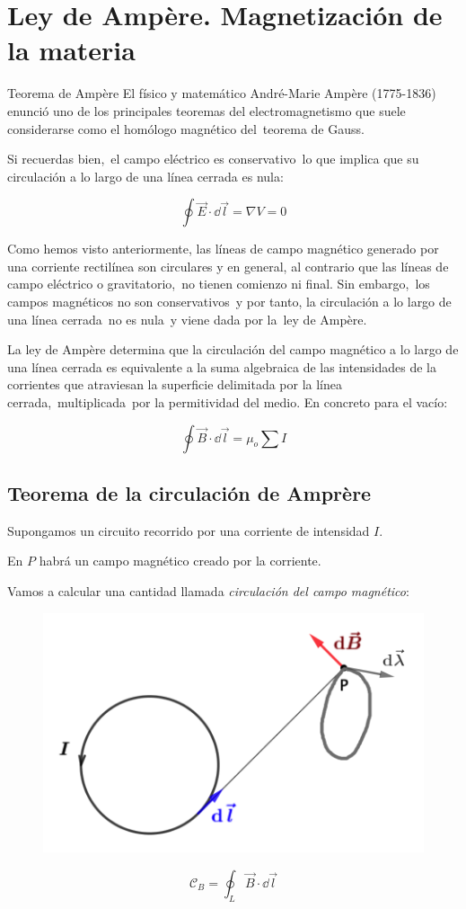 \chapter{Ley de Ampère. Magnetización de la materia}


\begin{miparrafo}
Teorema de Ampère
El físico y matemático André-Marie Ampère (1775-1836) enunció uno de los principales teoremas del electromagnetismo que suele considerarse como el homólogo magnético del teorema de Gauss.

Si recuerdas bien, el campo eléctrico es conservativo lo que implica que su circulación a lo largo de una línea cerrada es nula:

$$ \oint \vec E \cdot \dd \vec l = \nabla V =0$$

Como hemos visto anteriormente, las líneas de campo magnético generado por una corriente rectilínea son circulares y en general, al contrario que las líneas de campo eléctrico o gravitatorio, no tienen comienzo ni final. Sin embargo, los campos magnéticos no son conservativos y por tanto, la circulación a lo largo de una línea cerrada no es nula y viene dada por la ley de Ampère.

La ley de Ampère determina que la circulación del campo magnético a lo largo de una línea cerrada es equivalente a la suma algebraica de las intensidades de la corrientes que atraviesan la superficie delimitada por la línea cerrada, multiplicada por la permitividad del medio. En concreto para el vacío:

$$ \oint \vec B \cdot \dd \vec l = \mu_o \sum I$$

\rightline{\textcolor{gris}{`https://www.fisicalab.com/apartado/ley-de-ampere'}}
\end{miparrafo}

\section{Teorema de la circulación de Amprère}

\begin{multicols}{2}
Supongamos un circuito recorrido por una corriente de intensidad $I$.

En $P$ habrá un campo magnético creado por la corriente.

Vamos a calcular una cantidad llamada \emph{circulación del campo magnético}:
\begin{figure}[H]
	\centering
	\includegraphics[width=.5\textwidth]{imagenes/imagenes27/T27IM01.png}
\end{figure}	
\end{multicols}
$$\mathcal C_B=\displaystyle \oint_L \vec B \cdot \dd \vec l$$


